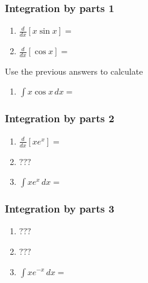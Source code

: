 \begin{frame}[t]
	\frametitle{Integration by parts 1}

	\begin{enumerate}
		\item $\displaystyle \frac{d}{dx}\left[ x \sin x \right] =$
			\vspace{.1cm}
			\vspace{.1cm}

		\item $\displaystyle \frac{d}{dx}\left[ \cos x \right] =$
			\vspace{.1cm}
			\vspace{.1cm}
	\end{enumerate}
	\vspace{.1cm}
	\vspace{.1cm}
	Use the previous answers to calculate
	\vspace{.1cm}
	\vspace{.1cm}
	\begin{enumerate}
		\addtocounter{enumi}{2}

		\item $\displaystyle \int x \cos x \, dx =$
	\end{enumerate}
\end{frame}

\begin{frame}[t]
	\frametitle{Integration by parts 2}

	\begin{enumerate}
		\item $\displaystyle \frac{d}{dx}\left[ x e^{x}\right] =$
			\vspace{.5cm}

		\item $\displaystyle ???$
			\vspace{.5cm}

		\item $\displaystyle \int x e^{x}\, dx =$
	\end{enumerate}
\end{frame}

\begin{frame}[t]
	\frametitle{Integration by parts 3}

	\begin{enumerate}
		\item $\displaystyle ???$
			\vspace{.3cm}

		\item $\displaystyle ???$
			\vspace{.3cm}

		\item $\displaystyle \int x e^{-x}\, dx =$
	\end{enumerate}
\end{frame}

